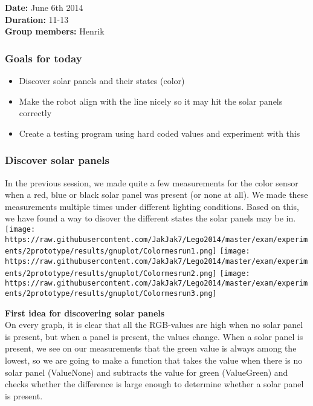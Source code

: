 \textbf{Date:} June 6th 2014\\\textbf{Duration:} 11-13\\\textbf{Group
members:} Henrik

\subsubsection{Goals for today}

\begin{itemize}
\itemsep1pt\parskip0pt
\item
  Discover solar panels and their states (color)
\item
  Make the robot align with the line nicely so it may hit the solar
  panels correctly
\item
  Create a testing program using hard coded values and experiment with
  this
\end{itemize}

\subsubsection{Discover solar panels}

In the previous session, we made quite a few measurements for the color
sensor when a red, blue or black solar panel was present (or none at
all). We made these measurements multiple times under different lighting
conditions. Based on this, we have found a way to disover the different
states the solar panels may be in.
\texttt{[image: https://raw.githubusercontent.com/JakJak7/Lego2014/master/exam/experiments/2prototype/results/gnuplot/Colormesrun1.png]}
\texttt{[image: https://raw.githubusercontent.com/JakJak7/Lego2014/master/exam/experiments/2prototype/results/gnuplot/Colormesrun2.png]}
\texttt{[image: https://raw.githubusercontent.com/JakJak7/Lego2014/master/exam/experiments/2prototype/results/gnuplot/Colormesrun3.png]}

\textbf{First idea for discovering solar panels}\\On every graph, it is
clear that all the RGB-values are high when no solar panel is present,
but when a panel is present, the values change. When a solar panel is
present, we see on our measurements that the green value is always among
the lowest, so we are going to make a function that takes the value when
there is no solar panel (ValueNone) and subtracts the value for green
(ValueGreen) and checks whether the difference is large enough to
determine whether a solar panel is present.

